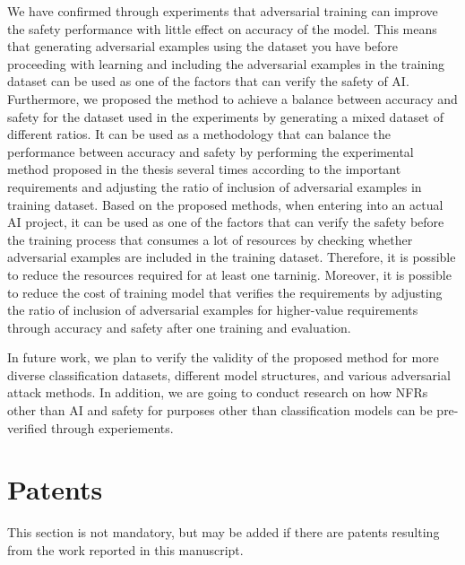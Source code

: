 \documentclass[journal,article,submit,moreauthors,pdftex]{Definitions/mdpi}
\begin{document}
We have confirmed through experiments that adversarial training can improve the safety performance with little effect on accuracy of the model.
This means that generating adversarial examples using the dataset you have before proceeding with learning and including the adversarial examples in the training dataset can be used as one of the factors that can verify the safety of AI.
Furthermore, we proposed the method to achieve a balance between accuracy and safety for the dataset used in the experiments by generating a mixed dataset of different ratios.
It can be used as a methodology that can balance the performance between accuracy and safety by performing the experimental method proposed in the thesis several times according to the important requirements and adjusting the ratio of inclusion of adversarial examples in training dataset.
Based on the proposed methods, when entering into an actual AI project, it can be used as one of the factors that can verify the safety before the training process that consumes a lot of resources by checking whether adversarial examples are included in the training dataset. Therefore, it is possible to reduce the resources required for at least one tarninig.
Moreover, it is possible to reduce the cost of training model that verifies the requirements by adjusting the ratio of inclusion of adversarial examples for higher-value requirements through accuracy and safety after one training and evaluation.

In future work, we plan to verify the validity of the proposed method for more diverse classification datasets, different model structures, and various adversarial attack methods.
In addition, we are going to conduct research on how NFRs other than AI and safety for purposes other than classification models can be pre-verified through experiements.

\section{Patents}

This section is not mandatory, but may be added if there are patents resulting from the work reported in this manuscript.

\vspace{6pt} 

\end{document}
